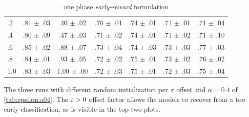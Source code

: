 \documentclass[%
  aspectratio=169,
  9pt,
  USenglish,
  titlegraphic, %
  progressbar,
]{beamer}
\begin{document}
\begin{frame}
\begin{table}
\begin{subtable}{.5\textwidth}
\begin{tabular}{lcccccc}
				.2 & .81 $\pm$ .03 & .40 $\pm$ .02 & .70 $\pm$ .01 & .74 $\pm$ .01 & .71 $\pm$ .01 & .71 $\pm$ .04 \\
				.4 & .80 $\pm$ .09 & .47 $\pm$ .03 & .71 $\pm$ .02 & .74 $\pm$ .01 & .71 $\pm$ .02 & .71 $\pm$ .10 \\
				.6 & .85 $\pm$ .02 & .88 $\pm$ .07 & .73 $\pm$ .04 & .74 $\pm$ .03 & .73 $\pm$ .03 & .77 $\pm$ .03 \\
				.8 & .84 $\pm$ .01 & .93 $\pm$ .05 & .72 $\pm$ .02 & .75 $\pm$ .01 & .73 $\pm$ .02 & .76 $\pm$ .02 \\
				1.0 & .83 $\pm$ .03 & 1.00 $\pm$ .00 & .72 $\pm$ .03 & .75 $\pm$ .01 & .72 $\pm$ .03 & .75 $\pm$ .04 \\
				\bottomrule
			\end{tabular}
			\caption{one phase \emph{early-reward} formulation}
			\label{tab:alpha:earlyreward}
		\end{subtable}
		
	\end{table}

\end{frame}

\begin{frame}
	
		
		\figepsilonzero
		{The three runs with different random initialization per $\varepsilon$ offset and $\alpha=0.4$ of \cref{tab:epsilon:a04}.
			The $\varepsilon>0$ offset factor allows the models to recover from a too early classification, as is visible in the top two plots.}
	
\end{frame}
\end{document}
